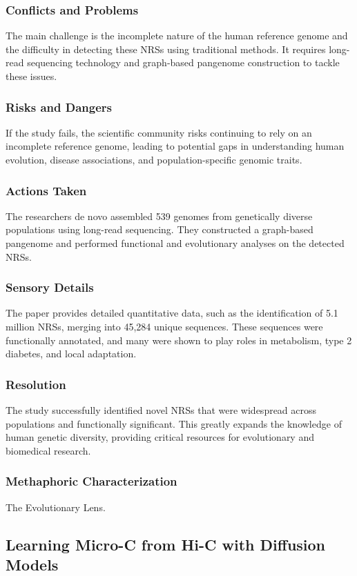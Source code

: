 \subsubsection{Conflicts and Problems}
The main challenge is the incomplete nature of the human reference genome and the difficulty in detecting these NRSs using traditional methods. It requires long-read sequencing technology and graph-based pangenome construction to tackle these issues.
\subsubsection{Risks and Dangers}
If the study fails, the scientific community risks continuing to rely on an incomplete reference genome, leading to potential gaps in understanding human evolution, disease associations, and population-specific genomic traits.
\subsubsection{Actions Taken}
The researchers de novo assembled 539 genomes from genetically diverse populations using long-read sequencing. They constructed a graph-based pangenome and performed functional and evolutionary analyses on the detected NRSs.
\subsubsection{Sensory Details}
The paper provides detailed quantitative data, such as the identification of 5.1 million NRSs, merging into 45,284 unique sequences. These sequences were functionally annotated, and many were shown to play roles in metabolism, type 2 diabetes, and local adaptation.
\subsubsection{Resolution}
The study successfully identified novel NRSs that were widespread across populations and functionally significant. This greatly expands the knowledge of human genetic diversity, providing critical resources for evolutionary and biomedical research.
\subsubsection{Methaphoric Characterization}
The Evolutionary Lens.

\subsection{Learning Micro-C from Hi-C with Diffusion Models}

